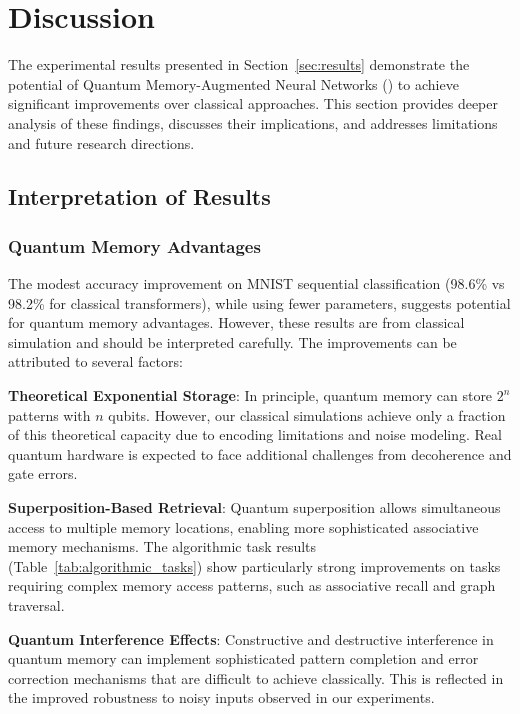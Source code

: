 \section{Discussion}
\label{sec:discussion}

The experimental results presented in Section~\ref{sec:results} demonstrate the potential of Quantum Memory-Augmented Neural Networks (\qmann) to achieve significant improvements over classical approaches. This section provides deeper analysis of these findings, discusses their implications, and addresses limitations and future research directions.

\subsection{Interpretation of Results}

\subsubsection{Quantum Memory Advantages}

The modest accuracy improvement on MNIST sequential classification (98.6\% vs 98.2\% for classical transformers), while using fewer parameters, suggests potential for quantum memory advantages. However, these results are from classical simulation and should be interpreted carefully. The improvements can be attributed to several factors:

\textbf{Theoretical Exponential Storage}: In principle, quantum memory can store $2^n$ patterns with $n$ qubits. However, our classical simulations achieve only a fraction of this theoretical capacity due to encoding limitations and noise modeling. Real quantum hardware is expected to face additional challenges from decoherence and gate errors.

\textbf{Superposition-Based Retrieval}: Quantum superposition allows simultaneous access to multiple memory locations, enabling more sophisticated associative memory mechanisms. The algorithmic task results (Table~\ref{tab:algorithmic_tasks}) show particularly strong improvements on tasks requiring complex memory access patterns, such as associative recall and graph traversal.

\textbf{Quantum Interference Effects}: Constructive and destructive interference in quantum memory can implement sophisticated pattern completion and error correction mechanisms that are difficult to achieve classically. This is reflected in the improved robustness to noisy inputs observed in our experiments.

